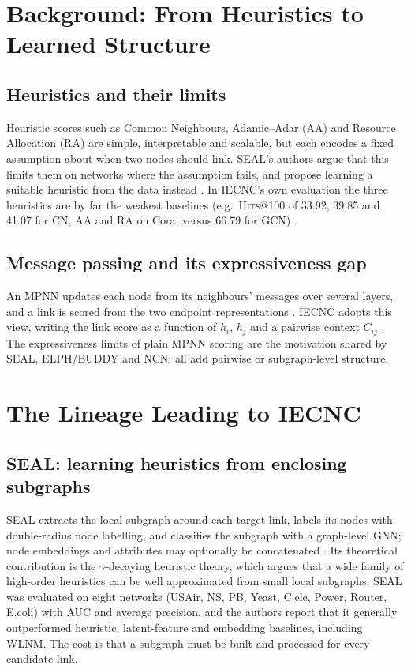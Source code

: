 \documentclass[11pt,a4paper]{article}
\makeatletter
\newcommand{\hits}{\textsc{Hits}@100}
\makeatother
\begin{document}
\section{Background: From Heuristics to Learned Structure}
\subsection{Heuristics and their limits}
Heuristic scores such as Common Neighbours, Adamic--Adar (AA) and Resource Allocation (RA)
are simple, interpretable and scalable, but each encodes a fixed assumption about when two
nodes should link. SEAL's authors argue that this limits them on networks where the
assumption fails, and propose learning a suitable heuristic from the data instead
\cite{zhang2018seal}. In IECNC's own evaluation the three heuristics are by far the weakest
baselines (e.g.\ \hits{} of 33.92, 39.85 and 41.07 for CN, AA and RA on Cora, versus 66.79
for GCN) \cite{zhou2025iecnc}.

\subsection{Message passing and its expressiveness gap}
An MPNN updates each node from its neighbours' messages over several layers, and a link is
scored from the two endpoint representations \cite{gilmer2017mpnn}. IECNC adopts this view,
writing the link score as a function of $h_i$, $h_j$ and a pairwise context $C_{ij}$
\cite{zhou2025iecnc}. The expressiveness limits of plain MPNN scoring are the motivation
shared by SEAL, ELPH/BUDDY and NCN: all add pairwise or subgraph-level structure.

\section{The Lineage Leading to IECNC}
\subsection{SEAL: learning heuristics from enclosing subgraphs}
SEAL extracts the local subgraph around each target link, labels its nodes with
double-radius node labelling, and classifies the subgraph with a graph-level GNN; node
embeddings and attributes may optionally be concatenated \cite{zhang2018seal}. Its theoretical
contribution is the $\gamma$-decaying heuristic theory, which argues that a wide family of
high-order heuristics can be well approximated from small local subgraphs. SEAL was evaluated on eight
networks (USAir, NS, PB, Yeast, C.ele, Power, Router, E.coli) with AUC and average precision, and the authors
report that it generally outperformed heuristic, latent-feature and embedding baselines,
including WLNM. The cost is that a subgraph must be built and processed for every candidate link.
\end{document}
